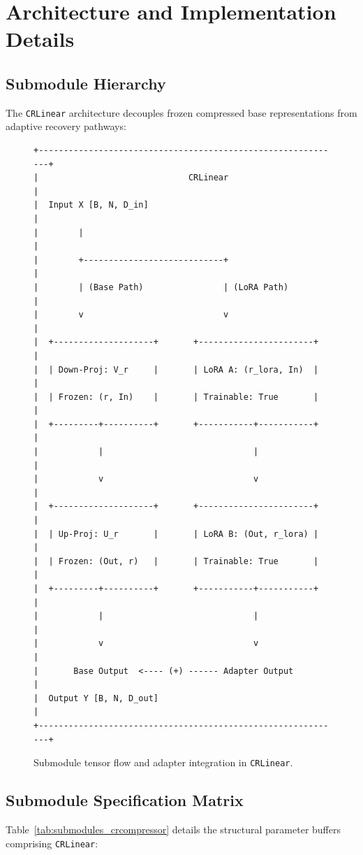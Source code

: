 \section{Architecture and Implementation Details}

\subsection{Submodule Hierarchy}
The \texttt{CRLinear} architecture decouples frozen compressed base representations from adaptive recovery pathways:

\begin{figure}[H]
\centering
\begin{verbatim}
+-------------------------------------------------------------+
|                              CRLinear                       |
|  Input X [B, N, D_in]                                       |
|        |                                                    |
|        +----------------------------+                       |
|        | (Base Path)                | (LoRA Path)           |
|        v                            v                       |
|  +--------------------+       +-----------------------+     |
|  | Down-Proj: V_r     |       | LoRA A: (r_lora, In)  |     |
|  | Frozen: (r, In)    |       | Trainable: True       |     |
|  +---------+----------+       +-----------+-----------+     |
|            |                              |                 |
|            v                              v                 |
|  +--------------------+       +-----------------------+     |
|  | Up-Proj: U_r       |       | LoRA B: (Out, r_lora) |     |
|  | Frozen: (Out, r)   |       | Trainable: True       |     |
|  +---------+----------+       +-----------+-----------+     |
|            |                              |                 |
|            v                              v                 |
|       Base Output  <---- (+) ------ Adapter Output          |
|  Output Y [B, N, D_out]                                     |
+-------------------------------------------------------------+
\end{verbatim}
\caption{Submodule tensor flow and adapter integration in \texttt{CRLinear}.}
\end{figure}

\subsection{Submodule Specification Matrix}
Table~\ref{tab:submodules_crcompressor} details the structural parameter buffers comprising \texttt{CRLinear}:

